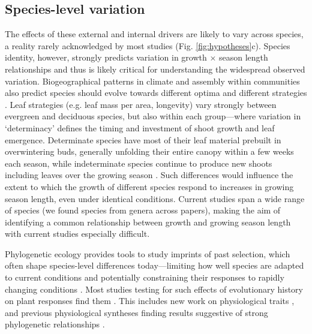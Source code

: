 
\subsection*{Species-level variation} 
The effects of these external and internal drivers are likely to vary across species, a reality rarely acknowledged by most studies (Fig. \ref{fig:hypotheses}c). Species identity, however, strongly predicts variation in growth $\times$ season length relationships \citep[e.g.][]{cuny2012life,michelot2012comparing} and thus is likely critical for understanding the widespread observed variation. Biogeographical patterns in climate and assembly within communities also predict species should evolve towards different optima and different strategies \citep{Ackerly:2009ly,buckley2012functional}. Leaf strategies (e.g. leaf mass per area, longevity) vary strongly between evergreen and deciduous species, but also within each group---where variation in `determinacy' defines the timing and investment of shoot growth and leaf emergence. Determinate species have most of their leaf material prebuilt in overwintering buds, generally unfolding their entire canopy within a few weeks each season, while indeterminate species continue to produce new shoots including leaves over the growing season \citep{kikuzawa1982leaf,Lechowicz:1984cr}. Such differences would influence the extent to which the growth of different species respond to increases in growing season length, even under identical conditions. Current studies span a wide range of species (we found   species from  genera across  papers), making the aim of identifying a common relationship between growth and growing season length with current studies especially difficult.

Phylogenetic ecology provides tools to study imprints of past selection, which often shape species-level differences today---limiting how well species are adapted to current conditions and potentially constraining their responses to rapidly changing conditions \citep{Ackerly:2009ly}.  %
Most studies testing for such effects of evolutionary history on plant responses find them \citep[e.g.][]{phenophylo}. This includes new work on physiological traits \citep{avila2023evidence}, and previous physiological syntheses finding results suggestive of strong phylogenetic relationships \citep[e.g.][]{way2010differential}.

